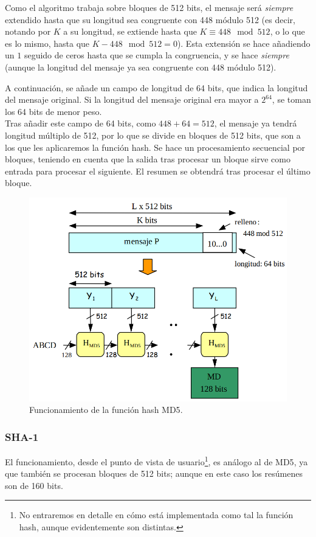 Como el algoritmo trabaja sobre bloques de 512 bits, el mensaje será \emph{siempre} extendido hasta que su longitud sea congruente con 448 módulo 512 (es decir, notando por $K$ a su longitud, se extiende hasta que $K\equiv 448\mod 512$, o lo que es lo mismo, hasta que $K-448\mod 512 = 0$). Esta extensión se hace añadiendo un $1$ seguido de ceros hasta que se cumpla la congruencia, y se hace \emph{siempre} (aunque la longitud del mensaje ya sea congruente con 448 módulo 512).

A continuación, se añade un campo de longitud de 64 bits, que indica la longitud del mensaje original. Si la longitud del mensaje original era mayor a $2^{64}$, se toman los 64 bits de menor peso.\\

Tras añadir este campo de 64 bits, como $448+64=512$, el mensaje ya tendrá longitud múltiplo de 512, por lo que se divide en bloques de 512 bits, que son a los que les aplicaremos la función hash. Se hace un procesamiento secuencial por bloques, teniendo en cuenta que la salida tras procesar un bloque sirve como entrada para procesar el siguiente. El resumen se obtendrá tras procesar el último bloque.
\begin{figure}
    \centering
    \includegraphics[width=0.7\linewidth]{./images/hash.png}
    \caption{Funcionamiento de la función hash \acrshort{MD5}.}
    \label{fig:md5}
\end{figure}

\subsubsection{\acrfull{SHA-1}}

El funcionamiento, desde el punto de vista de usuario\footnote{No entraremos en detalle en cómo está implementada como tal la función hash, aunque evidentemente son distintas.}, es análogo al de \acrshort{MD5}, ya que también se procesan bloques de 512 bits; aunque en este caso los resúmenes son de 160 bits.


